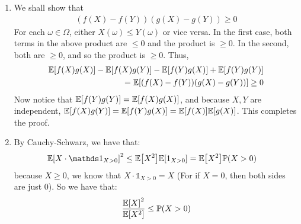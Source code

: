\documentclass[12pt]{article}
\theoremstyle{definitionstyle}
\newcommand{\1}{\mathds 1}
\renewcommand{\P}{\mathbb P \qty}
\newcommand{\E}{\mathbb E \qty}
\begin{document}
\begin{enumerate}
        \item We shall show that 
        \begin{align*}
            (f(X)-f(Y))(g(X)-g(Y)) \geq 0
        \end{align*}
        For each $\omega \in \Omega$, either $X(\omega) \leq Y(\omega)$ or vice versa. In the first case, both terms in the above product are $\leq 0$ and the product is $\geq 0$. In the second, both are $\geq 0$, and so the product is $\geq 0$.
        Thus,
        \begin{align*}
            \E[f(X)g(X)] - \E[f(X)g(Y)] - \E[f(Y)g(X)] + \E[f(Y)g(Y)] \\
            = \E[(f(X)-f(Y))(g(X)-g(Y))] \geq 0
        \end{align*}
        Now notice that $\E[f(Y)g(Y)] = \E[f(X)g(X)]$, and because $X,Y$ are independent, $\E[f(X)g(Y)] = \E[f(Y)g(X)] = \E[f(X)]\E[g(X)]$. This completes the proof.

        \item By Cauchy-Schwarz, we have that:
        \begin{align*}
            \E[X \cdot \1_{X > 0}]^2 &\leq \E[X^2]\E[1_{X>0}] = \E[X^2]\P(X>0)
        \end{align*}
        because $X \geq 0$, we know that $X \cdot \1_{X > 0} = X$ (For if $X = 0$, then both sides are just 0). So we have that:
        \begin{align*}
            \frac{\E[X]^2}{\E[X^2]} \leq \P(X > 0)
        \end{align*}


\end{enumerate}
\end{document}
